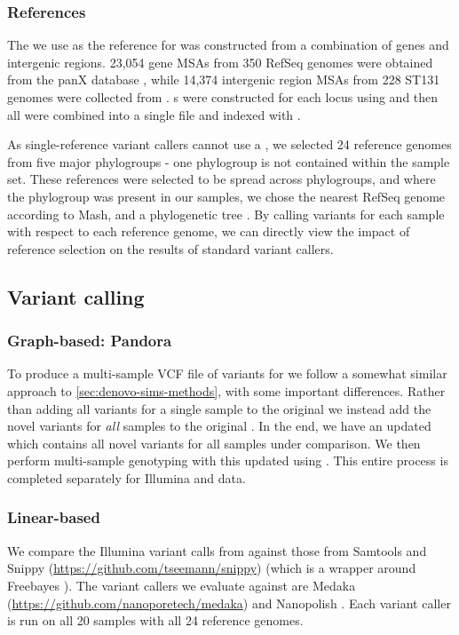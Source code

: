 \subsubsection{References}
The \panrg{} we use as the reference for \pandora{} was constructed from a combination of \ecoli{} genes and intergenic regions. 23,054 gene MSAs from 350 RefSeq genomes were obtained from the panX database \cite{panx}, while 14,374 intergenic region MSAs from 228 ST131 genomes were collected from \cite{thorpe2018}. \prg{}s were constructed for each locus using \makeprg{} and then all were combined into a single \panrg{} file and indexed with \pandora{}.

As single-reference variant callers cannot use a \panrg{}, we selected 24 reference genomes from five major phylogroups - one phylogroup is not contained within the sample set. These references were selected to be spread across phylogroups, and where the phylogroup was present in our samples, we chose the nearest RefSeq genome according to Mash, and a phylogenetic tree \cite{pandora}. By calling variants for each sample with respect to each reference genome, we can directly view the impact of reference selection on the results of standard variant callers.

\subsection{Variant calling}

\subsubsection{Graph-based: Pandora}
To produce a multi-sample VCF file of variants for \pandora{} we follow a somewhat similar approach to \autoref{sec:denovo-sims-methods}, with some important differences. Rather than adding all \denovo{} variants for a single sample to the original \panrg{} we instead add the novel variants for \emph{all} samples to the original \panrg{}. In the end, we have an updated \panrg{} which contains all novel variants for all samples under comparison. We then perform multi-sample genotyping with this updated \panrg{} using \compare{}. This entire process is completed separately for Illumina and \ont{} data.

\subsubsection{Linear-based}
We compare the Illumina variant calls from \pandora{} against those from Samtools \cite{samtools2009} and Snippy (\url{https://github.com/tseemann/snippy}) (which is a wrapper around Freebayes \cite{Garrison2012}). The \ont{} variant callers we evaluate against are Medaka (\url{https://github.com/nanoporetech/medaka}) and Nanopolish \cite{Loman2015}. Each variant caller is run on all 20 samples with all 24 reference genomes. 

